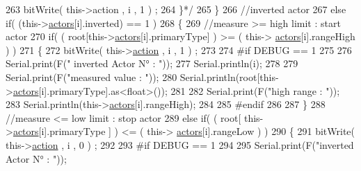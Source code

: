 \begin{DoxyCode}
263 \textcolor{comment}{                            bitWrite( this->action , i , 1 ) ;                      }
264 \textcolor{comment}{                        \}*/}
265                     \}
266                     \textcolor{comment}{//inverted actor}
267                     \textcolor{keywordflow}{else} \textcolor{keywordflow}{if}( (this->\hyperlink{class_jetpack_a7e16d2f97837f9712a2e6de1c50d99db}{actors}[i].inverted) == 1 )
268                     \{
269                         \textcolor{comment}{//measure >= high limit : start actor}
270                         \textcolor{keywordflow}{if}( ( root[this->\hyperlink{class_jetpack_a7e16d2f97837f9712a2e6de1c50d99db}{actors}[i].primaryType] ) >= ( this->
      \hyperlink{class_jetpack_a7e16d2f97837f9712a2e6de1c50d99db}{actors}[i].rangeHigh ) )   
271                         \{   
272                             bitWrite( this->\hyperlink{class_jetpack_aca3142925a7b0834b34ae91d26af7765}{action} , i , 1 ) ;
273 
274 \textcolor{preprocessor}{                        #if DEBUG == 1}
275 
276                             Serial.print(F(\textcolor{stringliteral}{" inverted Actor N° : "}));
277                             Serial.println(i);
278                             
279                             Serial.print(F(\textcolor{stringliteral}{"measured value : "}));
280                             Serial.println(root[this->\hyperlink{class_jetpack_a7e16d2f97837f9712a2e6de1c50d99db}{actors}[i].primaryType].as<float>());
281 
282                             Serial.print(F(\textcolor{stringliteral}{"high range : "}));
283                             Serial.println(this->\hyperlink{class_jetpack_a7e16d2f97837f9712a2e6de1c50d99db}{actors}[i].rangeHigh);
284                         
285 \textcolor{preprocessor}{                        #endif}
286                             
287                         \}
288                         \textcolor{comment}{//measure <= low limit : stop actor}
289                         \textcolor{keywordflow}{else} \textcolor{keywordflow}{if}( ( root[ this->\hyperlink{class_jetpack_a7e16d2f97837f9712a2e6de1c50d99db}{actors}[i].primaryType ] ) <= ( this->
      \hyperlink{class_jetpack_a7e16d2f97837f9712a2e6de1c50d99db}{actors}[i].rangeLow ) )
290                         \{
291                             bitWrite( this->\hyperlink{class_jetpack_aca3142925a7b0834b34ae91d26af7765}{action} , i , 0 ) ;
292 
293 \textcolor{preprocessor}{                        #if DEBUG == 1}
294                             
295                             Serial.print(F(\textcolor{stringliteral}{"inverted Actor N° : "}));

\end{DoxyCode}
